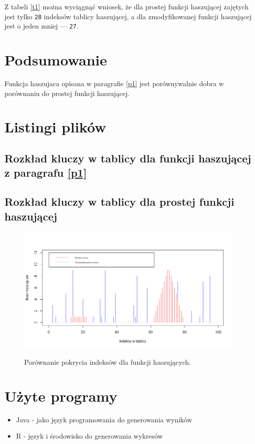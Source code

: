 \documentclass{article}
\begin{document}
	Z tabeli \ref{t1} można wyciągnąć wniosek, że dla prostej funkcji haszującej zajętych jest tylko \texttt{28} indeksów tablicy haszującej, a dla zmodyfikowanej funkcji haszującej jest o jeden mniej --- \texttt{27}. 
\section{Podsumowanie}
Funkcja haszujaca opisana w paragrafie \ref{p1} jest porównywalnie dobra w porównaniu do prostej funkcji haszującej.


\section{Listingi plików}
	\subsection{Rozkład kluczy w tablicy dla funkcji haszującej z paragrafu \ref{p1}}
		\begin{mdframed}[style=eliasp]
			
		\end{mdframed}	
	\subsection{Rozkład kluczy w tablicy dla prostej funkcji haszującej}
		\begin{mdframed}[style=eliasp]
			
		\end{mdframed}	
	\begin{figure}[h] 		
		\includegraphics[angle=90]{porownanie.png}
		\label{r2}
		\caption{Porównanie pokrycia indeksów dla funkcji haszujących.}	
	\end{figure}
\section{Użyte programy}
\begin{itemize}
	\item Java - jako język programowania do generowania wyników
	\item R - język i środowisko do generowania wykresów
\end{itemize}
\end{document}
